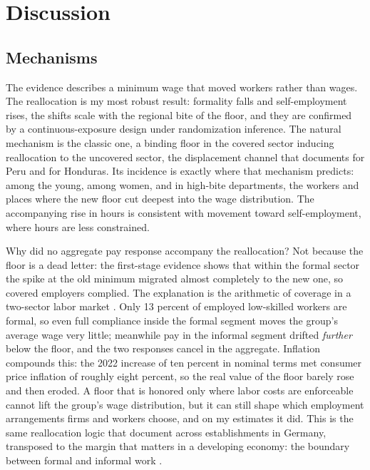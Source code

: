 \section{Discussion}\label{sec:discussion}

\subsection{Mechanisms}

The evidence describes a minimum wage that moved workers rather than wages. The
reallocation is my most robust result: formality falls and self-employment rises, the
shifts scale with the regional bite of the floor, and they are confirmed by a
continuous-exposure design under randomization inference. The natural mechanism is the
classic one, a binding floor in the covered sector inducing reallocation to the uncovered
sector, the displacement channel that \citet{jaramillo_lopez_2006} documents for Peru
and \citet{ham_2018_honduras} for Honduras. Its incidence is exactly where that mechanism
predicts: among the young, among women, and in high-bite departments, the workers and
places where the new floor cut deepest into the wage distribution. The accompanying rise
in hours is consistent with movement toward self-employment, where hours are less
constrained.

Why did no aggregate pay response accompany the reallocation? Not because the floor is
a dead letter: the first-stage evidence shows that within the formal sector the spike
at the old minimum migrated almost completely to the new one, so covered employers
complied. The explanation is the arithmetic of coverage in a two-sector labor market
\citep{ulyssea_2018}. Only 13 percent of employed low-skilled workers are formal, so
even full compliance inside the formal segment moves the group's average wage very
little; meanwhile pay in the informal segment drifted \emph{further} below the floor,
and the two responses cancel in the aggregate. Inflation compounds this: the 2022
increase of ten percent in nominal terms met consumer price inflation of roughly eight
percent, so the real value of the floor barely rose and then eroded. A floor that is
honored only where labor costs are enforceable cannot lift the group's wage
distribution, but it can still shape which employment arrangements firms and workers
choose, and on my estimates it did. This is the same reallocation logic that
\citet{dustmann_2022} document across establishments in Germany, transposed to the
margin that matters in a developing economy: the boundary between formal and informal
work \citep{jales_2018}.

